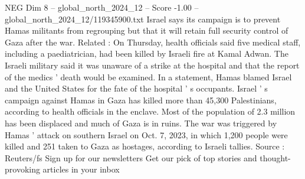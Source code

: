 \begin{textsample}{NEG Dim 8 – global\_north\_2024\_12 – Score -1.00 – global\_north\_2024\_12/119345900.txt}
Israel says its campaign is to prevent Hamas militants from regrouping but that it will retain full security control of Gaza after the war.
Related : On Thursday, health officials said five medical staff, including a paediatrician, had been killed by Israeli fire at Kamal Adwan.
The Israeli military said it was unaware of a strike at the hospital and that the report of the medics ' death would be examined.
In a statement, Hamas blamed Israel and the United States for the fate of the hospital ' s occupants.
Israel ' s campaign against Hamas in Gaza has killed more than 45,300 Palestinians, according to health officials in the enclave.
Most of the population of 2.3 million has been displaced and much of Gaza is in ruins.
The war was triggered by Hamas ' attack on southern Israel on Oct. 7, 2023, in which 1,200 people were killed and 251 taken to Gaza as hostages, according to Israeli tallies.
Source : Reuters/fs Sign up for our newsletters Get our pick of top stories and thought-provoking articles in your inbox

\end{textsample}
